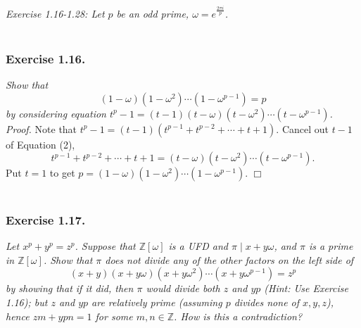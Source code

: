 \documentclass{article}
\begin{document}



\emph{Exercise 1.16-1.28: Let $p$ be an odd prime,
$\omega = e^{\frac{2\pi i}{p}}$.} \\\\



\subsubsection*{Exercise 1.16.}
\emph{Show that
$$(1-\omega)(1-\omega^2) \cdots (1-\omega^{p-1}) = p$$
by considering equation
$t^p - 1 = (t-1)(t-\omega)(t-\omega^2) \cdots (t-\omega^{p-1})$.} \\

\emph{Proof.}
Note that
$t^p - 1 = (t-1)(t^{p-1} + t^{p-2} + \cdots + t + 1)$.
Cancel out $t-1$ of Equation (2),
$$t^{p-1} + t^{p-2} + \cdots + t + 1 = (t-\omega)(t-\omega^2) \cdots (t-\omega^{p-1}).$$
Put $t = 1$ to get
$p = (1-\omega)(1-\omega^2) \cdots (1-\omega^{p-1})$.
$\Box$ \\\\






\subsubsection*{Exercise 1.17.}
\emph{Let $x^p + y^p = z^p$.
Suppose that $\mathbb{Z}[\omega]$ is a UFD and $\pi \mid x + y\omega$,
and $\pi$ is a prime in $\mathbb{Z}[\omega]$.
Show that $\pi$ does not divide any of the other factors on the left side of
$$(x+y)(x+y\omega)(x+y\omega^2) \cdots (x+y\omega^{p-1}) = z^p$$
by showing that if it did, then $\pi$ would divide both $z$ and $yp$
(Hint: Use Exercise 1.16);
but $z$ and $yp$ are relatively prime (assuming $p$ divides none of $x, y, z$),
hence $zm + ypn = 1$ for some $m, n \in \mathbb{Z}$.
How is this a contradiction? } \\
\end{document}
